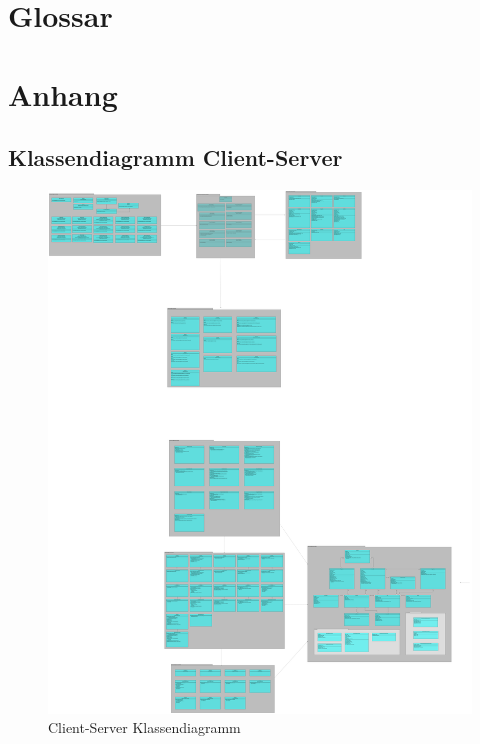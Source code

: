 \documentclass[a4paper]{scrreprt}
\begin{document}
\chapter{Glossar}
	

\chapter{Anhang}
\section{Klassendiagramm Client-Server}
 \begin{figure}[H]
	       \centering
	       \includegraphics[width=\textwidth,height=\textheight]{client_server_klassen.png}
	       \caption{Client-Server Klassendiagramm}
	      \end{figure}
\end{document}
